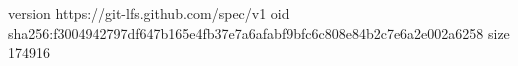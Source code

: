 version https://git-lfs.github.com/spec/v1
oid sha256:f3004942797df647b165e4fb37e7a6afabf9bfc6c808e84b2c7e6a2e002a6258
size 174916
